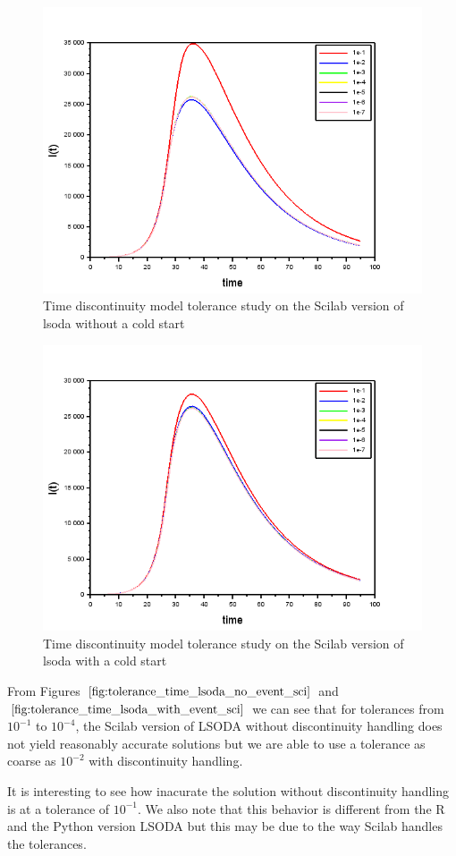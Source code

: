 \begin{figure}[H]
\centering
\includegraphics[width=0.7\linewidth]{./figures/tolerance_time_lsoda_no_event_sci}
\caption{Time discontinuity model tolerance study on the Scilab version of lsoda without a cold start}
\label{fig:tolerance_time_lsoda_no_event_sci}
\end{figure}

\begin{figure}[H]
\centering
\includegraphics[width=0.7\linewidth]{./figures/tolerance_time_lsoda_with_event_sci}
\caption{Time discontinuity model tolerance study on the Scilab version of lsoda with a cold start}
\label{fig:tolerance_time_lsoda_with_event_sci}
\end{figure}

From Figures $\ref{fig:tolerance_time_lsoda_no_event_sci}$ and $\ref{fig:tolerance_time_lsoda_with_event_sci}$ we can see that for tolerances from $10^{-1}$ to $10^{-4}$, the Scilab version of LSODA without discontinuity handling does not yield reasonably accurate solutions but we are able to use a tolerance as coarse as $10^{-2}$ with discontinuity handling. 

It is interesting to see how inacurate the solution without discontinuity handling is at a tolerance of $10^{-1}$. We also note that this behavior is different from the R and the Python version LSODA but this may be due to the way Scilab handles the tolerances.

